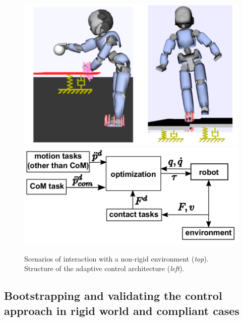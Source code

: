 \documentclass[final,5p,twocolumn]{elsarticle}
\begin{document}
\begin{figure}[h!]
\centering
\includegraphics[width=0.8\linewidth]{images/LIU_IROS_2015}\\\includegraphics[width=0.8\linewidth]{images/LIU_IROS_2015_bis}
\caption{Scenarios of interaction with a non-rigid environment (\textit{top}). Structure of the adaptive control architecture (\textit{left}).}
\label{fig:LIU_IROS_2015}
\end{figure}

\subsection{Bootstrapping and validating the control approach in rigid world and compliant cases}
\end{document}
